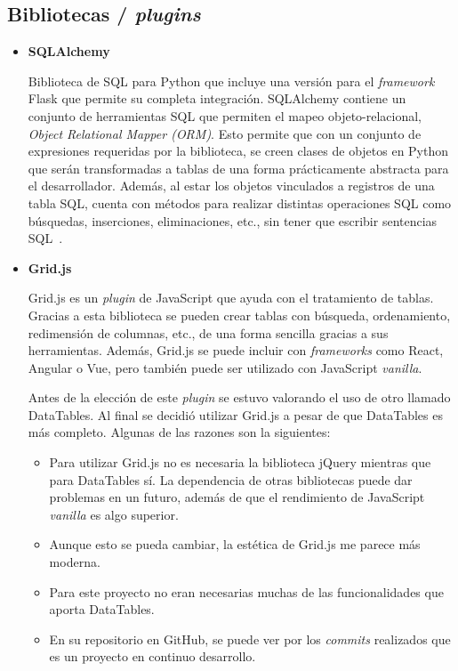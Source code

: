 \subsection{Bibliotecas / \textit{plugins}}
\begin{itemize}
\item\textbf{SQLAlchemy}

Biblioteca de SQL para Python que incluye una versión para el \textit{framework} Flask que permite su completa integración. 
SQLAlchemy contiene un conjunto de herramientas SQL que permiten el mapeo objeto-relacional, \textit{Object Relational Mapper (ORM)}. 
Esto permite que con un conjunto de expresiones requeridas por la biblioteca, se creen clases de objetos en Python que serán transformadas a tablas de una forma prácticamente abstracta para el desarrollador. 
Además, al estar los objetos vinculados a registros de una tabla SQL, cuenta con métodos para realizar distintas operaciones SQL como búsquedas, inserciones, eliminaciones, etc., sin tener que escribir sentencias SQL~\cite{sqlAlchemy}.

\item\textbf{Grid.js}

Grid.js es un \textit{plugin} de JavaScript que ayuda con el tratamiento de tablas. 
Gracias a esta biblioteca se pueden crear tablas con búsqueda, ordenamiento, redimensión de columnas, etc., de una forma sencilla gracias a sus herramientas. 
Además, Grid.js se puede incluir con \textit{frameworks} como React, Angular o Vue, pero también puede ser utilizado con JavaScript \textit{vanilla}.


Antes de la elección de este \textit{plugin} se estuvo valorando el uso de otro llamado DataTables. Al final se decidió utilizar Grid.js a pesar de que DataTables es más completo.
Algunas de las razones son la siguientes:
\begin{itemize}
\item Para utilizar Grid.js no es necesaria la biblioteca jQuery mientras que para DataTables sí. La dependencia de otras bibliotecas puede dar problemas en un futuro, además de que el rendimiento de JavaScript \textit{vanilla} es algo superior.
\item Aunque esto se pueda cambiar, la estética de Grid.js me parece más moderna.
\item Para este proyecto no eran necesarias muchas de las funcionalidades que aporta DataTables.
\item En su repositorio en GitHub, se puede ver por los \textit{commits} realizados que es un proyecto en continuo desarrollo.
\end{itemize}


\end{itemize}
